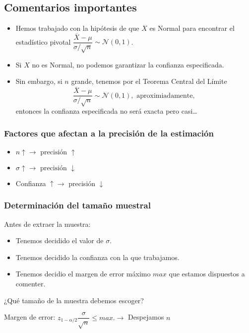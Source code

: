 \subsection{Comentarios importantes}
\begin{tcolorbox}[colback=olive!5!white, colframe=olive!75!black, title=\textbf{Si $X$ no es Normal}]
\begin{itemize}[label=\textbullet]
    \item Hemos trabajado con la hipótesis de que $X$ es Normal para encontrar el estadístico pivotal $\dfrac{\overline{X}-\mu}{\sigma / \sqrt{n} }\sim \mathcal{N}(0,1)$.
    \item Si $X$ no es Normal, no podemos garantizar la confianza especificada.
    \item Sin embargo, si $n$ grande, tenemos por el Teorema Central del Límite \[
    \dfrac{\overline{X}-\mu}{\sigma / \sqrt{n} }\sim \mathcal{N}(0,1),\text{ aproximiadamente, }
    \] 
    entonces la confianza especificada no será exacta pero casi\dots
\end{itemize}
\end{tcolorbox}
\subsubsection{Factores que afectan a la precisión de la estimación}
\begin{tcolorbox}[colback=olive!5!white, colframe=olive!75!black, title=\textbf{El margen de error es $z_{1-\alpha /2}\dfrac{\sigma}{\sqrt{n} }$.}]
\begin{itemize}[label=\textbullet]
    \item $n\uparrow\longrightarrow \text{ precisión }\uparrow$
    \item $\sigma\uparrow\longrightarrow \text{ precisión }\downarrow$ 
    \item Confianza $\uparrow\longrightarrow $ precisión $\downarrow$
\end{itemize}
\end{tcolorbox}
\subsubsection{Determinación del tamaño muestral}
\begin{tcolorbox}[colback=blue!5!white, colframe=blue!75!black, title=\textbf{Contexto}]
Antes de extraer la muestra:
\begin{itemize}[label=\textbullet]
    \item Tenemos decidido el valor de $\sigma$.
    \item Tenemos decidido la confianza con la que trabajamos.
    \item Tenemos decidio el margen de error máximo $max$ que estamos dispuestos a comenter.
\end{itemize}
¿Qué tamaño de la muestra debemos escoger?
\end{tcolorbox}
Margen de error: $z_{1-\alpha /2}\dfrac{\sigma}{\sqrt{n} }\le max.\longrightarrow $ Despejamos $n$
